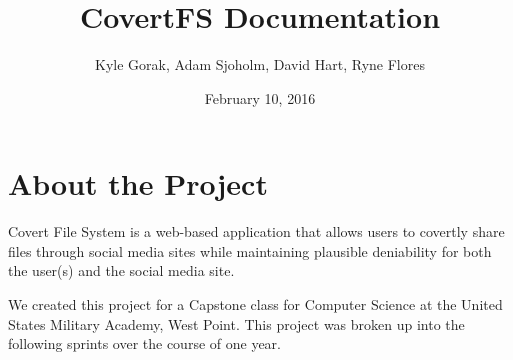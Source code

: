 \documentclass[letterpaper,10pt,english]{sphinxmanual}
\title{CovertFS Documentation}
\date{February 10, 2016}
\author{Kyle Gorak, Adam Sjoholm, David Hart, Ryne Flores}
\begin{document}
\maketitle
\tableofcontents

\chapter{About the Project}
\label{index:about-the-project}
Covert File System is a web-based application that allows users to covertly share files through social media sites while maintaining plausible deniability for both the user(s) and the social media site.

We created this project for a Capstone class for Computer Science at the United States Military Academy, West Point. This project was broken up into the following sprints over the course of one year.
\end{document}
